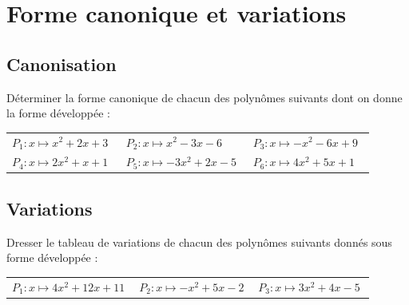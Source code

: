 \documentclass[oneside,12pt]{article}          %
\begin{document}
\section{Forme canonique et variations}

\subsection{Canonisation}
Déterminer la forme canonique de chacun des polynômes suivants dont on donne la forme développée :

\renewcommand{\arraystretch}{1.3}
\begin{tabular}{p{0.3\linewidth} p{0.3\linewidth} p{0.3\linewidth}}
	$P_1:x\mapsto x^2+2x+3$ & $P_2:x\mapsto x^2-3x-6$ & $P_3:x\mapsto -x^2-6x+9$ \\
 $P_4:x\mapsto 2x^2+x+1$ & $P_5:x\mapsto -3x^2+2x-5$ & $P_6:x\mapsto 4x^2+5x+1$
\end{tabular}



\subsection{Variations}
Dresser le tableau de variations de chacun des polynômes suivants donnés sous forme développée :

\begin{tabular}{p{0.3\linewidth} p{0.3\linewidth} p{0.3\linewidth}}
	$P_1:x\mapsto 4x^2+12x+11$ & $P_2:x\mapsto -x^2+5x-2$ & $P_3:x\mapsto 3x^2+4x-5$
\end{tabular}
\end{document}
